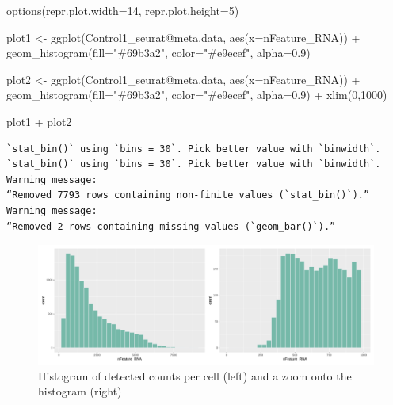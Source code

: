 \documentclass[
  letterpaper,
  DIV=11,
  numbers=noendperiod]{scrartcl}
\newenvironment{Shaded}{\begin{snugshade}}{\end{snugshade}}
\newcommand{\AttributeTok}[1]{\textcolor[rgb]{0.49,0.56,0.16}{#1}}
\newcommand{\DecValTok}[1]{\textcolor[rgb]{0.25,0.63,0.44}{#1}}
\newcommand{\FloatTok}[1]{\textcolor[rgb]{0.25,0.63,0.44}{#1}}
\newcommand{\FunctionTok}[1]{\textcolor[rgb]{0.02,0.16,0.49}{#1}}
\newcommand{\NormalTok}[1]{\textcolor[rgb]{0.00,0.44,0.13}{#1}}
\newcommand{\OtherTok}[1]{\textcolor[rgb]{0.00,0.44,0.13}{#1}}
\newcommand{\SpecialCharTok}[1]{\textcolor[rgb]{0.25,0.44,0.63}{#1}}
\newcommand{\StringTok}[1]{\textcolor[rgb]{0.25,0.44,0.63}{#1}}
\begin{document}
\begin{Shaded}
\begin{Highlighting}[]
\FunctionTok{options}\NormalTok{(}\AttributeTok{repr.plot.width=}\DecValTok{14}\NormalTok{, }\AttributeTok{repr.plot.height=}\DecValTok{5}\NormalTok{)}

\NormalTok{plot1 }\OtherTok{\textless{}{-}} \FunctionTok{ggplot}\NormalTok{(Control1\_seurat}\SpecialCharTok{@}\NormalTok{meta.data, }\FunctionTok{aes}\NormalTok{(}\AttributeTok{x=}\NormalTok{nFeature\_RNA)) }\SpecialCharTok{+} 
     \FunctionTok{geom\_histogram}\NormalTok{(}\AttributeTok{fill=}\StringTok{"\#69b3a2"}\NormalTok{, }\AttributeTok{color=}\StringTok{"\#e9ecef"}\NormalTok{, }\AttributeTok{alpha=}\FloatTok{0.9}\NormalTok{)}

\NormalTok{plot2 }\OtherTok{\textless{}{-}} \FunctionTok{ggplot}\NormalTok{(Control1\_seurat}\SpecialCharTok{@}\NormalTok{meta.data, }\FunctionTok{aes}\NormalTok{(}\AttributeTok{x=}\NormalTok{nFeature\_RNA)) }\SpecialCharTok{+} 
     \FunctionTok{geom\_histogram}\NormalTok{(}\AttributeTok{fill=}\StringTok{"\#69b3a2"}\NormalTok{, }\AttributeTok{color=}\StringTok{"\#e9ecef"}\NormalTok{, }\AttributeTok{alpha=}\FloatTok{0.9}\NormalTok{) }\SpecialCharTok{+}
     \FunctionTok{xlim}\NormalTok{(}\DecValTok{0}\NormalTok{,}\DecValTok{1000}\NormalTok{)}


\NormalTok{plot1 }\SpecialCharTok{+}\NormalTok{ plot2}
\end{Highlighting}
\end{Shaded}

\begin{verbatim}
`stat_bin()` using `bins = 30`. Pick better value with `binwidth`.
`stat_bin()` using `bins = 30`. Pick better value with `binwidth`.
Warning message:
“Removed 7793 rows containing non-finite values (`stat_bin()`).”
Warning message:
“Removed 2 rows containing missing values (`geom_bar()`).”
\end{verbatim}

\begin{figure}[H]

{\centering \includegraphics{notebook_files/figure-pdf/fig-genecounts-output-2.png}

}

\caption{\label{fig-genecounts}Histogram of detected counts per cell
(left) and a zoom onto the histogram (right)}

\end{figure}
\end{document}
